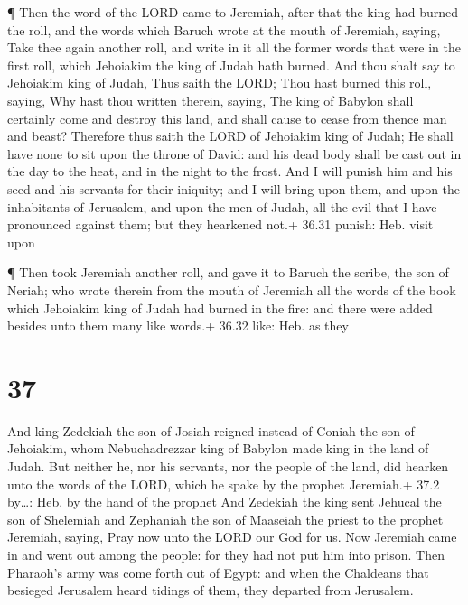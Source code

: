  ¶ Then the word of the LORD came to Jeremiah, after that
the king had burned the roll, and the words which Baruch wrote at the
mouth of Jeremiah, saying,  Take thee again another roll,
and write in it all the former words that were in the first roll, which
Jehoiakim the king of Judah hath burned.  And thou shalt
say to Jehoiakim king of Judah, Thus saith the LORD; Thou hast burned
this roll, saying, Why hast thou written therein, saying, The king of
Babylon shall certainly come and destroy this land, and shall cause to
cease from thence man and beast?  Therefore thus saith the
LORD of Jehoiakim king of Judah; He shall have none to sit upon the
throne of David: and his dead body shall be cast out in the day to the
heat, and in the night to the frost.  And I will punish him
and his seed and his servants for their iniquity; and I will bring upon
them, and upon the inhabitants of Jerusalem, and upon the men of Judah,
all the evil that I have pronounced against them; but they hearkened
not.+ 36.31 punish: Heb. visit upon

 ¶ Then took Jeremiah another roll, and gave it to Baruch
the scribe, the son of Neriah; who wrote therein from the mouth of
Jeremiah all the words of the book which Jehoiakim king of Judah had
burned in the fire: and there were added besides unto them many like
words.+ 36.32 like: Heb. as they

\hypertarget{section-36}{%
\section{37}\label{section-36}}

 And king Zedekiah the son of Josiah reigned instead of
Coniah the son of Jehoiakim, whom Nebuchadrezzar king of Babylon made
king in the land of Judah.  But neither he, nor his
servants, nor the people of the land, did hearken unto the words of the
LORD, which he spake by the prophet Jeremiah.+ 37.2 by\ldots: Heb. by
the hand of the prophet  And Zedekiah the king sent Jehucal
the son of Shelemiah and Zephaniah the son of Maaseiah the priest to the
prophet Jeremiah, saying, Pray now unto the LORD our God for us.
 Now Jeremiah came in and went out among the people: for
they had not put him into prison.  Then Pharaoh's army was
come forth out of Egypt: and when the Chaldeans that besieged Jerusalem
heard tidings of them, they departed from Jerusalem.

